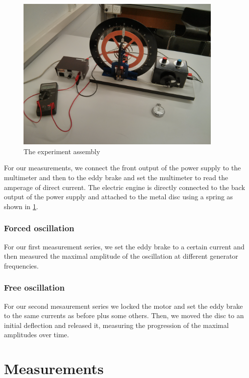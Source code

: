 \documentclass{scrreprt}
\begin{document}
\begin{figure}[H]
	\centering
  \includegraphics[width=0.9\textwidth]{img/assembly.jpg}
	\caption{The experiment assembly}
	\label{fig:assembly}
\end{figure}

For our measurements, we connect the front output of the power supply to the multimeter and then to the eddy brake and set the multimeter to read the amperage of direct current. The electric engine is directly connected to the back output of the power supply and attached to the metal disc using a spring as shown in \ref{fig:assembly}.
\subsubsection{Forced oscillation}
For our first measurement series, we set the eddy brake to a certain current and then measured the maximal amplitude of the oscillation at different generator frequencies.
\subsubsection{Free oscillation}
For our second mesaurement series we locked the motor and set the eddy brake to the same currents as before plus some others. Then, we moved the disc to an initial deflection and released it, measuring the progression of the maximal amplitudes over time.

\section{Measurements}
\end{document}
